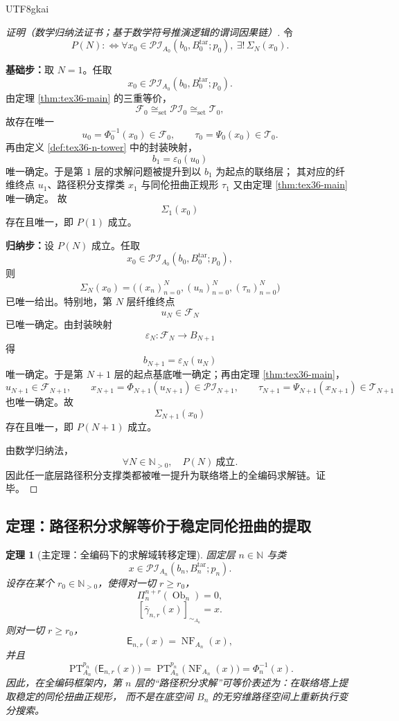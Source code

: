 \documentclass[12pt]{article}
\newtheorem{theorem}{定理}[section]
\newcommand{\NN}{\mathbb{N}}
\newcommand{\PT}{\operatorname{PT}}
\newcommand{\NF}{\operatorname{NF}}
\newcommand{\Ob}{\operatorname{Ob}}
\begin{document}
\begin{CJK*}{UTF8}{gkai}
\begin{proof}[证明（数学归纳法证书；基于数学符号推演逻辑的谓词因果链）]
令
\[
  P(N)
  :
  \Longleftrightarrow
  \forall x_0\in \mathcal{PI}_{A_0}(b_0,B_0^{\mathrm{tar}};p_0),\
  \exists!\,\Sigma_N(x_0).
\]

\textbf{基础步：}取 $N=1$。任取
\[
  x_0\in \mathcal{PI}_{A_0}(b_0,B_0^{\mathrm{tar}};p_0).
\]
由定理 \ref{thm:tex36-main} 的三重等价，
\[
  \mathcal{F}_0
  \cong_{\mathrm{set}}
  \mathcal{PI}_0
  \cong_{\mathrm{set}}
  \mathcal{T}_0,
\]
故存在唯一
\[
  u_0=\Phi_0^{-1}(x_0)\in \mathcal{F}_0,
  \qquad
  \tau_0=\Psi_0(x_0)\in \mathcal{T}_0.
\]
再由定义 \ref{def:tex36-n-tower} 中的封装映射，
\[
  b_1=\varepsilon_0(u_0)
\]
唯一确定。于是第 $1$ 层的求解问题被提升到以 $b_1$ 为起点的联络层；
其对应的纤维终点 $u_1$、路径积分支撑类 $x_1$ 与同伦扭曲正规形 $\tau_1$ 又由定理 \ref{thm:tex36-main} 唯一确定。
故
\[
  \Sigma_1(x_0)
\]
存在且唯一，即 $P(1)$ 成立。

\textbf{归纳步：}设 $P(N)$ 成立。任取
\[
  x_0\in \mathcal{PI}_{A_0}(b_0,B_0^{\mathrm{tar}};p_0),
\]
则
\[
  \Sigma_N(x_0)
  =
  \bigl(
    (x_n)_{n=0}^{N},
    (u_n)_{n=0}^{N},
    (\tau_n)_{n=0}^{N}
  \bigr)
\]
已唯一给出。特别地，第 $N$ 层纤维终点
\[
  u_N\in \mathcal{F}_N
\]
已唯一确定。由封装映射
\[
  \varepsilon_N:\mathcal{F}_N\to B_{N+1}
\]
得
\[
  b_{N+1}=\varepsilon_N(u_N)
\]
唯一确定。于是第 $N+1$ 层的起点基底唯一确定；再由定理 \ref{thm:tex36-main}，
\[
  u_{N+1}\in \mathcal{F}_{N+1},\qquad
  x_{N+1}=\Phi_{N+1}(u_{N+1})\in \mathcal{PI}_{N+1},\qquad
  \tau_{N+1}=\Psi_{N+1}(x_{N+1})\in \mathcal{T}_{N+1}
\]
也唯一确定。故
\[
  \Sigma_{N+1}(x_0)
\]
存在且唯一，即 $P(N+1)$ 成立。

由数学归纳法，
\[
  \forall N\in\NN_{>0},\quad P(N)\ \text{成立}.
\]
因此任一底层路径积分支撑类都被唯一提升为联络塔上的全编码求解链。证毕。
\end{proof}

\subsection{定理：路径积分求解等价于稳定同伦扭曲的提取}
\label{subsec:tex36-solve-as-twist}

\begin{theorem}[主定理：全编码下的求解域转移定理]
\label{thm:tex36-solve-transfer}
固定层 $n\in\NN$ 与类
\[
  x\in \mathcal{PI}_{A_n}(b_n,B_n^{\mathrm{tar}};p_n).
\]
设存在某个 $r_0\in\NN_{>0}$，使得对一切 $r\ge r_0$，
\[
  \Pi_n^{n+r}(\Ob_n)=0,
\]
\[
  [\bar{\gamma}_{n,r}(x)]_{\sim_{A_n}}=x.
\]
则对一切 $r\ge r_0$，
\[
  \mathsf E_{n,r}(x)=\NF_{A_n}(x),
\]
并且
\[
  \PT_{A_n}^{p_n}\bigl(\mathsf E_{n,r}(x)\bigr)
  =
  \PT_{A_n}^{p_n}\bigl(\NF_{A_n}(x)\bigr)
  =
  \Phi_n^{-1}(x).
\]
因此，在全编码框架内，第 $n$ 层的“路径积分求解”可等价表述为：在联络塔上提取稳定的同伦扭曲正规形，
而不是在底空间 $B_n$ 的无穷维路径空间上重新执行变分搜索。
\end{theorem}


\end{CJK*}
\end{document}
